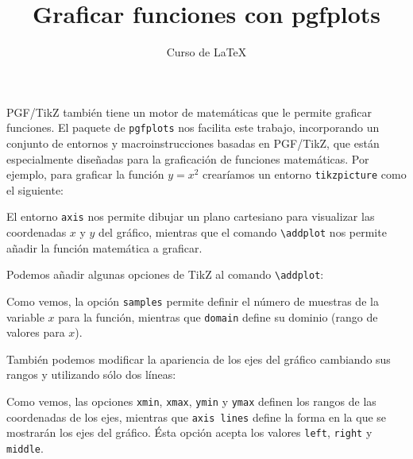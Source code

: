 \documentclass[12pt,letterpaper]{article}
\author{Curso de \LaTeX}
\title{Graficar funciones con pgfplots}
\begin{document}
\maketitle
PGF/TikZ también tiene un motor de matemáticas que le permite graficar funciones. El paquete de  \texttt{pgfplots} nos facilita este trabajo, incorporando un conjunto de entornos y macroinstrucciones basadas en PGF/TikZ, que están especialmente diseñadas para la graficación de funciones matemáticas. Por ejemplo, para graficar la función $y = x^2$ crearíamos un entorno \texttt{tikzpicture} como el siguiente:


El entorno \texttt{axis} nos permite dibujar un plano cartesiano para visualizar las coordenadas $x$ y $y$ del gráfico, mientras que el comando \texttt{\textbackslash addplot} nos permite añadir la función matemática a graficar.

Podemos añadir algunas opciones de TikZ al comando \texttt{\textbackslash addplot}:


Como vemos, la opción \texttt{samples} permite definir el número de muestras de la variable $x$ para la función, mientras que \texttt{domain} define su dominio (rango de valores para $x$).

También podemos modificar la apariencia de los ejes del gráfico cambiando sus rangos y utilizando sólo dos líneas: 


Como vemos, las opciones \texttt{xmin}, \texttt{xmax}, \texttt{ymin} y \texttt{ymax} definen los rangos de las coordenadas de los ejes, mientras que \texttt{axis lines} define la forma en la que se mostrarán los ejes del gráfico. Ésta opción acepta los valores \texttt{left}, \texttt{right} y \texttt{middle}.
\end{document}
